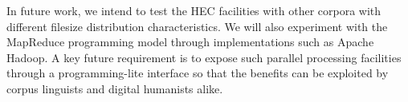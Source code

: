 
In future work, we intend to test the HEC facilities with other corpora with different filesize distribution characteristics. We will also experiment with the MapReduce programming model through implementations such as Apache Hadoop. A key future requirement is to expose such parallel processing facilities through a programming-lite interface so that the benefits can be exploited by corpus linguists and digital humanists alike.










% 
% 
% 
% 
% 
% 
% 
% 
